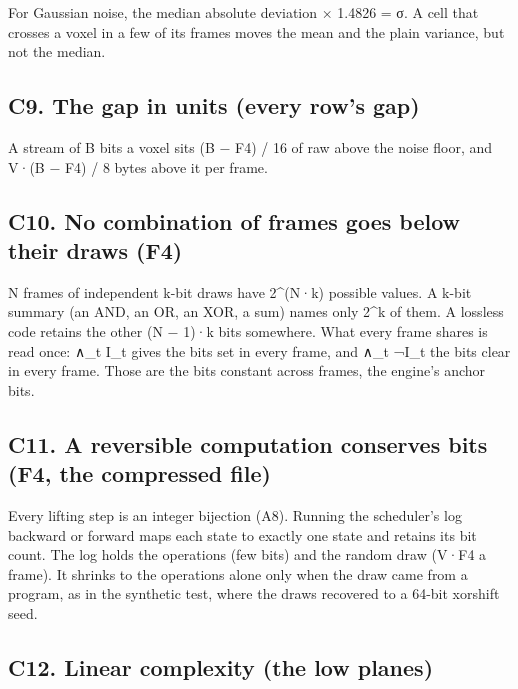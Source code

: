 For Gaussian noise, the median absolute deviation × 1.4826 = σ. A cell that crosses a voxel in a few of its frames moves the mean and the plain variance, but not the median.

\subsection{\texorpdfstring{C9. The gap in units (every row's gap)}{C9. The gap in units (every row's gap)}}

A stream of B bits a voxel sits (B − F4) / 16 of raw above the noise floor, and V·(B − F4) / 8 bytes above it per frame.

\subsection{\texorpdfstring{C10. No combination of frames goes below their draws (F4)}{C10. No combination of frames goes below their draws (F4)}}

N frames of independent k-bit draws have 2\textasciicircum{}(N·k) possible values. A k-bit summary (an AND, an OR, an XOR, a sum) names only 2\textasciicircum{}k of them. A lossless code retains the other (N − 1)·k bits somewhere. What every frame shares is read once: ∧\_\allowbreak{}t I\_\allowbreak{}t gives the bits set in every frame, and ∧\_\allowbreak{}t ¬I\_\allowbreak{}t the bits clear in every frame. Those are the bits constant across frames, the engine's anchor bits.

\subsection{\texorpdfstring{C11. A reversible computation conserves bits (F4, the compressed file)}{C11. A reversible computation conserves bits (F4, the compressed file)}}

Every lifting step is an integer bijection (A8). Running the scheduler's log backward or forward maps each state to exactly one state and retains its bit count. The log holds the operations (few bits) and the random draw (V·F4 a frame). It shrinks to the operations alone only when the draw came from a program, as in the synthetic test, where the draws recovered to a 64-bit xorshift seed.

\subsection{\texorpdfstring{C12. Linear complexity (the low planes)}{C12. Linear complexity (the low planes)}}

